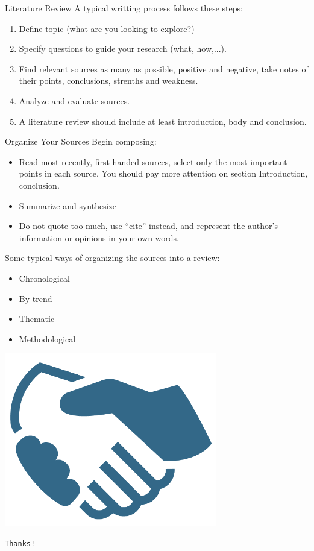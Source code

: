 \documentclass[10pt]{beamer}
\begin{document}
\begin{frame}[t]{Literature Review}
A typical writting process follows these steps:
\begin{enumerate}
    \item Define topic (what are you looking to explore?)
    \item Specify questions to guide your research (what, how,...).
    \item Find relevant sources as many as possible, positive
        and negative, take notes of their points, conclusions,
        strenths and weakness.
    \item Analyze and evaluate sources.
    \item A literature review should include at least introduction,
        body and conclusion.
\end{enumerate}
\end{frame}

\begin{frame}[t]{Organize Your Sources}
Begin composing:
\begin{itemize}
    \item Read most recently, first-handed sources, select only
        the most important points in each source. You should pay
        more attention on section \alert{Introduction},
        \alert{conclusion}.
    \item Summarize and synthesize
    \item Do not quote too much, use ``\alert{cite}'' instead, and
        represent the author's information or opinions in your own words.
\end{itemize}
Some typical ways of organizing the sources into a review:
\begin{itemize}
    \item Chronological
    \item By trend
    \item Thematic
    \item Methodological
\end{itemize}
\end{frame}

\begin{frame}

\centering
\includegraphics[width=.5\textwidth]{shakinghands.png}

    \texttt{\Huge Thanks!}
\end{frame}
\end{document}
